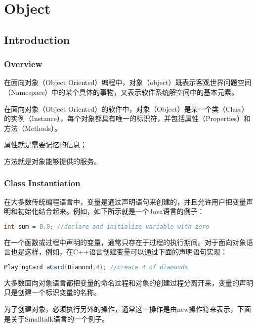 \part{Object}


\chapter{Introduction}


\section{Overview}

在面向对象（Object Oriented）编程中，对象（object）既表示客观世界问题空间（Namespace）中的某个具体的事物，又表示软件系统解空间中的基本元素。

在面向对象（Object Oriented）的软件中，对象（Object）是某一个类（Class）的实例（Instance），每个对象都具有唯一的标识符，并包括属性（Properties）和方法（Methods）。

\begin{compactitem}
\item 属性就是需要记忆的信息；
\item 方法就是对象能够提供的服务。
\end{compactitem}

\section{Class Instantiation}


在大多数传统编程语言中，变量是通过声明语句来创建的，并且允许用户把变量声明和初始化结合起来。例如，如下所示就是一个Java语言的例子：


\begin{lstlisting}[language=Java]
int sum = 0.0; //declare and initialize variable with zero
\end{lstlisting}

在一个函数或过程中声明的变量，通常只存在于过程的执行期间。对于面向对象语言也是这样，例如，在C++语言创建变量可以通过下面的声明语句实现：



\begin{lstlisting}[language=Java]
PlayingCard aCard(Diamond,4); //create 4 of diamonds
\end{lstlisting}

大多数面向对象语言都把变量的命名过程和对象的创建过程分离开来，变量的声明只是创建一个标识变量的名称。

为了创建对象，必须执行另外的操作，通常这一操作是由new操作符来表示，下面是关于Smalltalk语言的一个例子。

